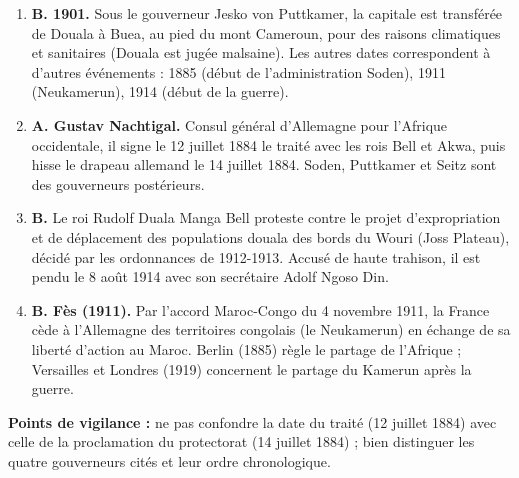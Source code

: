 \documentclass[11pt]{article}
\begin{document}
\begin{corrige}
\begin{enumerate}
    \item \textbf{B. 1901.} Sous le gouverneur Jesko von Puttkamer, la capitale est transférée de Douala à Buea, au pied du mont Cameroun, pour des raisons climatiques et sanitaires (Douala est jugée malsaine). Les autres dates correspondent à d'autres événements : 1885 (début de l'administration Soden), 1911 (Neukamerun), 1914 (début de la guerre).
    \item \textbf{A. Gustav Nachtigal.} Consul général d'Allemagne pour l'Afrique occidentale, il signe le 12 juillet 1884 le traité avec les rois Bell et Akwa, puis hisse le drapeau allemand le 14 juillet 1884. Soden, Puttkamer et Seitz sont des gouverneurs postérieurs.
    \item \textbf{B.} Le roi Rudolf Duala Manga Bell proteste contre le projet d'expropriation et de déplacement des populations douala des bords du Wouri (Joss Plateau), décidé par les ordonnances de 1912-1913. Accusé de haute trahison, il est pendu le 8 août 1914 avec son secrétaire Adolf Ngoso Din.
    \item \textbf{B. Fès (1911).} Par l'accord Maroc-Congo du 4 novembre 1911, la France cède à l'Allemagne des territoires congolais (le Neukamerun) en échange de sa liberté d'action au Maroc. Berlin (1885) règle le partage de l'Afrique ; Versailles et Londres (1919) concernent le partage du Kamerun après la guerre.
\end{enumerate}
\textbf{Points de vigilance :} ne pas confondre la date du traité (12 juillet 1884) avec celle de la proclamation du protectorat (14 juillet 1884) ; bien distinguer les quatre gouverneurs cités et leur ordre chronologique.
\end{corrige}
\end{document}
